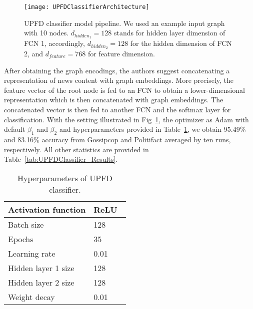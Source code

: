 \begin{figure}
    \centering
    \texttt{[image: UPFDClassifierArchitecture]}
    \caption[UPFD classifier model pipeline]{UPFD classifier model pipeline. We used an example input graph with 10 nodes. $d_{hidden_1} = 128$ stands for hidden layer dimension of FCN 1, accordingly, $d_{hidden_2} = 128$ for the hidden dimension of FCN 2, and $d_{feature} = 768$ for feature dimension.}
    \label{fig:UPFDClassifierArchitecture}
\end{figure}
After obtaining the graph encodings, the authors suggest concatenating a representation of news content with graph embeddings. More precisely, the feature vector of the root node is fed to an FCN to obtain a lower-dimensional representation which is then concatenated with graph embeddings. The concatenated vector is then fed to another FCN and the softmax layer for classification. With the setting illustrated in Fig~\ref{fig:UPFDClassifierArchitecture}, the optimizer as Adam with default $\beta_1$ and $\beta_2$ and hyperparameters provided in Table~\ref{tab:UPFDClassifier_Hyperparameters}, we obtain 95.49\% and 83.16\% accuracy from Gossipcop and Politifact averaged by ten runs, respectively. All other statistics are provided in Table~\ref{tab:UPFDClassifier_Results}.\\
\begin{table}
    \centering
    \begin{tabular}{|l|l|}
        \hline
        Activation function & ReLU~\parencite{ReLU_Nair} \\
        \hline
        Batch size          & 128                        \\
        \hline
        Epochs              & 35                         \\
        \hline
        Learning rate       & 0.01                       \\
        \hline
        Hidden layer 1 size & 128                        \\
        \hline
        Hidden layer 2 size & 128                        \\
        \hline
        Weight decay        & 0.01                       \\
        \hline
    \end{tabular}
    \caption[Hyperparameters of UPFD classifier.]{Hyperparameters of UPFD classifier.}
    \label{tab:UPFDClassifier_Hyperparameters}
\end{table}
